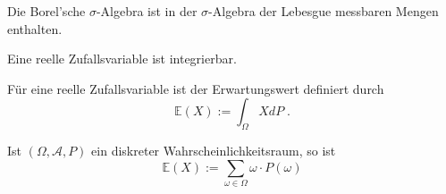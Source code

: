 \begin{Satz}
Die Borel'sche   $\sigma$-Algebra ist in der $\sigma$-Algebra der Lebesgue messbaren Mengen enthalten.
\end{Satz}


\begin{Satz}
Eine reelle Zufallsvariable ist integrierbar.
\end{Satz}


\begin{Definition}
Für eine reelle Zufallsvariable ist der Erwartungswert definiert durch
$$ \mathbb{E} (X) := \int_{\Omega} X dP \; .$$
\end{Definition}

\begin{Satz}
Ist $(\Omega, \mathcal{A}, P)$ ein diskreter Wahrscheinlichkeitsraum, so ist
$$ \mathbb{E} (X) := \sum_{\omega \in \Omega}  \omega \cdot P(\omega)$$
\end{Satz}



